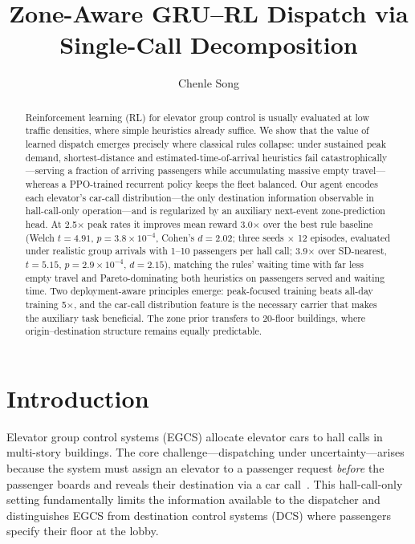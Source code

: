 \documentclass{IEEEcsmag}
\begin{document}

\title{Zone-Aware GRU--RL Dispatch via
Single-Call Decomposition}

\author{Chenle Song}


\begin{abstract}
Reinforcement learning (RL) for elevator group control is usually
evaluated at low traffic densities, where simple heuristics already
suffice. We show that the value of learned dispatch emerges precisely
where classical rules collapse: under sustained peak demand,
shortest-distance and estimated-time-of-arrival heuristics fail
catastrophically---serving a fraction of arriving passengers while
accumulating massive empty travel---whereas a PPO-trained recurrent
policy keeps the fleet balanced. Our agent encodes each elevator's
car-call distribution---the only destination information observable
in hall-call-only operation---and is regularized by an auxiliary
next-event zone-prediction head. At 2.5$\times$ peak rates it
improves mean reward 3.0$\times$ over the best rule baseline (Welch
$t = 4.91$, $p = 3.8\times10^{-4}$, Cohen's $d = 2.02$; three seeds
$\times$ 12 episodes, evaluated under realistic group arrivals with
1--10 passengers per hall call; 3.9$\times$ over SD-nearest,
$t = 5.15$, $p = 2.9\times10^{-4}$, $d = 2.15$), matching the rules'
waiting time with far less empty travel and Pareto-dominating both heuristics on
passengers served and waiting time. Two deployment-aware principles
emerge: peak-focused training beats all-day training 5$\times$, and
the car-call distribution feature is the necessary carrier that
makes the auxiliary task beneficial. The zone prior transfers to
20-floor buildings, where origin--destination structure remains
equally predictable.
\end{abstract}

\maketitle
\section{Introduction}
\label{sec:introduction}

Elevator group control systems (EGCS) allocate elevator cars to hall
calls in multi-story buildings. The core challenge---dispatching
under uncertainty---arises because the system must assign an elevator
to a passenger request \emph{before} the passenger boards and reveals
their destination via a car call~\cite{barney2003elevator}. This
hall-call-only setting fundamentally limits the information available
to the dispatcher and distinguishes EGCS from destination control
systems (DCS) where passengers specify their floor at the lobby.
\end{document}
